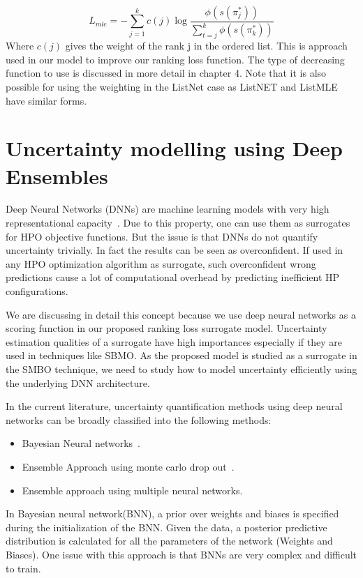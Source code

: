 \documentclass[12pt, twoside, ngerman]{report}
\begin{document}
\begin{equation}
L_{mle} = -  \sum\limits_{j=1}^{k} c(j) \log \frac{\phi(s(\pi^*_j))}{ \sum\limits_{t=j}^k \phi(s(\pi^*_k))}
\end{equation}
Where $c(j)$ gives the weight of the rank j in the ordered list.
This is approach used in our model to improve our ranking loss function.
The type of decreasing function to use is discussed in more detail in chapter 4.
Note that it is also possible for using the weighting in the ListNet case as ListNET and ListMLE have similar forms.

\section{Uncertainty modelling using Deep Ensembles}\label{sec:uncertaintyDeepEnsembles}

Deep Neural Networks (DNNs) are machine learning models with very high representational capacity~\cite{Goodfellow-et-al-2016}.
Due to this property,  one can use them as surrogates for HPO objective functions.
But the issue is that DNNs do not quantify uncertainty trivially.
In fact the results can be seen as overconfident.
If used in any HPO optimization algorithm as surrogate,  such overconfident wrong predictions cause a lot of computational overhead by predicting inefficient HP configurations.

We are discussing in detail this concept because we use deep neural networks as a scoring function in our proposed ranking loss surrogate model.
Uncertainty estimation qualities of a surrogate have high importances especially if they are used in techniques like SBMO.
As the proposed model is studied as a surrogate in the SMBO technique,  we need to study how to model uncertainty efficiently using the underlying DNN architecture.

In the current literature,  uncertainty quantification methods using deep neural networks can be broadly classified into the following methods:
\begin{itemize}
\item Bayesian Neural networks~\cite{Goan-2020}.
\item Ensemble Approach using monte carlo drop out~\cite{JMLR:v15:srivastava14a}.
\item Ensemble approach using multiple neural networks.
\end{itemize}

In Bayesian neural network(BNN),  a prior over weights and biases is specified during the initialization of the BNN.
Given the data,  a posterior predictive distribution is calculated for all the parameters of the network (Weights and Biases).
One issue with this approach is that BNNs are very complex and difficult to train. 
\end{document}
